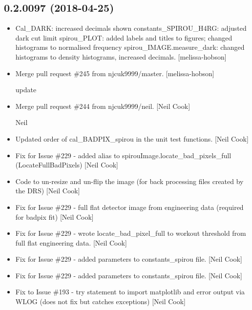 \documentclass[a4paper,10pt,english]{report}
\begin{document}
\subsection{0.2.0097 (2018-04-25)}
\label{\detokenize{misc/changelog:id453}}\begin{itemize}
\item {} 
Cal\_DARK: increased decimals shown constants\_SPIROU\_H4RG: adjusted
dark cut limit spirou\_PLOT: added labels and titles to figures;
changed histograms to normalised frequency spirou\_IMAGE.measure\_dark:
changed histograms to density histograms, increased decimals.
{[}melissa-hobson{]}

\item {} 
Merge pull request \#245 from njcuk9999/master. {[}melissa-hobson{]}

update

\item {} 
Merge pull request \#244 from njcuk9999/neil. {[}Neil Cook{]}

Neil

\item {} 
Updated order of cal\_BADPIX\_spirou in the unit test functions. {[}Neil
Cook{]}

\item {} 
Fix for Issue \#229 - added alias to spirouImage.locate\_bad\_pixels\_full
(LocateFullBadPixels) {[}Neil Cook{]}

\item {} 
Code to un-resize and un-flip the image (for back processing files
created by the DRS) {[}Neil Cook{]}

\item {} 
Fix for Issue \#229 - full flat detector image from engineering data
(required for badpix fit) {[}Neil Cook{]}

\item {} 
Fix for Issue \#229 - wrote locate\_bad\_pixel\_full to workout threshold
from full flat engineering data. {[}Neil Cook{]}

\item {} 
Fix for Issue \#229 - added parameters to constants\_spirou file. {[}Neil
Cook{]}

\item {} 
Fix for Issue \#229 - added parameters to constants\_spirou file. {[}Neil
Cook{]}

\item {} 
Fix to Issue \#193 - try statement to import matplotlib and error
output via WLOG (does not fix but catches exceptions) {[}Neil Cook{]}


\end{itemize}
\end{document}
